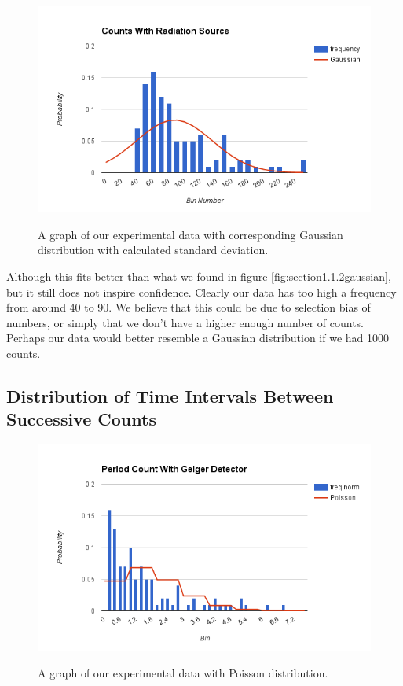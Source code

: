 \documentclass[12pt letterpaper]{article}
\begin{document}
\begin{figure}[H]
  \caption{A graph of our experimental data with corresponding Gaussian distribution with calculated standard deviation.}
  \centering
    \includegraphics[width=.75\textwidth]{section1_1_2_gaussian_std_dev.png}
    \label{fig:section1.1.2gaussianstddev}
\end{figure}

Although this fits better than what we found in figure \ref{fig:section1.1.2gaussian}, but it still does not inspire confidence. Clearly our data has too high a frequency from around 40 to 90. We believe that this could be due to selection bias of numbers, or simply that we don't have a higher enough number of counts. Perhaps our data would better resemble a Gaussian distribution if we had 1000 counts. 

\subsection*{Distribution of Time Intervals Between Successive Counts}

\begin{figure}[H]
  \caption{A graph of our experimental data with Poisson distribution.}
  \centering
    \includegraphics[width=.75\textwidth]{section1_2_1_poisson.png}
    \label{fig:section1.2.1poisson}
\end{figure}
\end{document}
